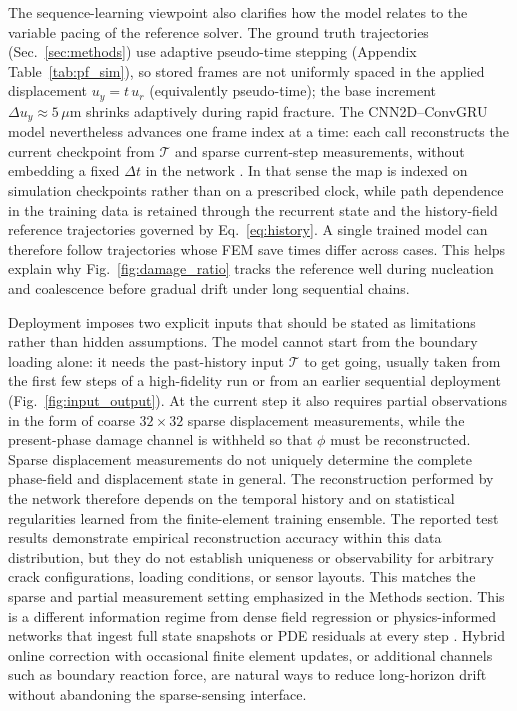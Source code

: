 \documentclass[10pt]{article}
\theoremstyle{definition}
\begin{document}
The sequence-learning viewpoint also clarifies how the model relates to the variable pacing of the reference solver.
%
The ground truth trajectories (Sec.~\ref{sec:methods}) use adaptive pseudo-time stepping (Appendix Table~\ref{tab:pf_sim}), so stored frames are not uniformly spaced in the applied displacement $u_y=t\,u_r$ (equivalently pseudo-time); the base increment $\Delta u_y\approx5\,\mu\mathrm{m}$ shrinks adaptively during rapid fracture.
%
The CNN2D--ConvGRU model nevertheless advances one frame index at a time: each call reconstructs the current checkpoint from $\mathcal{T}$ and sparse current-step measurements, without embedding a fixed $\Delta t$ in the network \cite{shi2015,ballas2016}.
%
In that sense the map is indexed on simulation checkpoints rather than on a prescribed clock, while path dependence in the training data is retained through the recurrent state and the history-field reference trajectories governed by Eq.~\eqref{eq:history}.
%
A single trained model can therefore follow trajectories whose FEM save times differ across cases.
%
This helps explain why Fig.~\ref{fig:damage_ratio} tracks the reference well during nucleation and coalescence before gradual drift under long sequential chains.

Deployment imposes two explicit inputs that should be stated as limitations rather than hidden assumptions.
%
The model cannot start from the boundary loading alone: it needs the past-history input $\mathcal{T}$ to get going, usually taken from the first few steps of a high-fidelity run or from an earlier sequential deployment (Fig.~\ref{fig:input_output}).
%
At the current step it also requires partial observations in the form of coarse $32\times32$ sparse displacement measurements, while the present-phase damage channel is withheld so that $\phi$ must be reconstructed.
%
Sparse displacement measurements do not uniquely determine the complete phase-field and displacement state in general.
%
The reconstruction performed by the network therefore depends on the temporal history and on statistical regularities learned from the finite-element training ensemble.
%
The reported test results demonstrate empirical reconstruction accuracy within this data distribution, but they do not establish uniqueness or observability for arbitrary crack configurations, loading conditions, or sensor layouts.
%
This matches the sparse and partial measurement setting emphasized in the Methods section.
%
This is a different information regime from dense field regression or physics-informed networks that ingest full state snapshots or PDE residuals at every step \cite{lee2020,raissi2019}.
%
Hybrid online correction with occasional finite element updates, or additional channels such as boundary reaction force, are natural ways to reduce long-horizon drift without abandoning the sparse-sensing interface.
\end{document}

